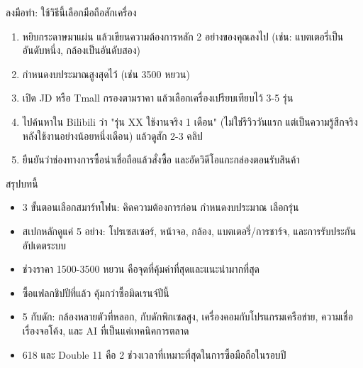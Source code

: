 \begin{tcbpractice}{ลงมือทำ: ใช้วิธีนี้เลือกมือถือสักเครื่อง}
\begin{enumerate}
  \item หยิบกระดาษมาแผ่น แล้วเขียนความต้องการหลัก 2 อย่างของคุณลงไป (เช่น: แบตเตอรี่เป็นอันดับหนึ่ง, กล้องเป็นอันดับสอง)
  \item กำหนดงบประมาณสูงสุดไว้ (เช่น 3500 หยวน)
  \item เปิด JD หรือ Tmall กรองตามราคา แล้วเลือกเครื่องเปรียบเทียบไว้ 3-5 รุ่น
  \item ไปค้นหาใน Bilibili ว่า "รุ่น XX ใช้งานจริง 1 เดือน" (ไม่ใช่รีวิววันแรก แต่เป็นความรู้สึกจริงหลังใช้งานอย่างน้อยหนึ่งเดือน) แล้วดูสัก 2-3 คลิป
  \item ยืนยันว่าช่องทางการซื้อน่าเชื่อถือแล้วสั่งซื้อ และอัดวิดีโอแกะกล่องตอนรับสินค้า
\end{enumerate}

\end{tcbpractice}

\begin{tcbsummary}{สรุปบทนี้}
\begin{itemize}
  \item 3 ขั้นตอนเลือกสมาร์ทโฟน: คิดความต้องการก่อน กำหนดงบประมาณ เลือกรุ่น
  \item สเปกหลักดูแค่ 5 อย่าง: โปรเซสเซอร์, หน้าจอ, กล้อง, แบตเตอรี่/การชาร์จ, และการรับประกันอัปเดตระบบ
  \item ช่วงราคา 1500-3500 หยวน คือจุดที่คุ้มค่าที่สุดและแนะนำมากที่สุด
  \item ซื้อแฟลกชิปปีที่แล้ว คุ้มกว่าซื้อมิดเรนจ์ปีนี้
  \item 5 กับดัก: กล้องหลายตัวที่หลอก, กับดักพิกเซลสูง, เครื่องคอมกับโปรแกรมเครือข่าย, ความเชื่อเรื่องจอโค้ง, และ AI ที่เป็นแค่เทคนิคการตลาด
  \item 618 และ Double 11 คือ 2 ช่วงเวลาที่เหมาะที่สุดในการซื้อมือถือในรอบปี
\end{itemize}

\end{tcbsummary}
